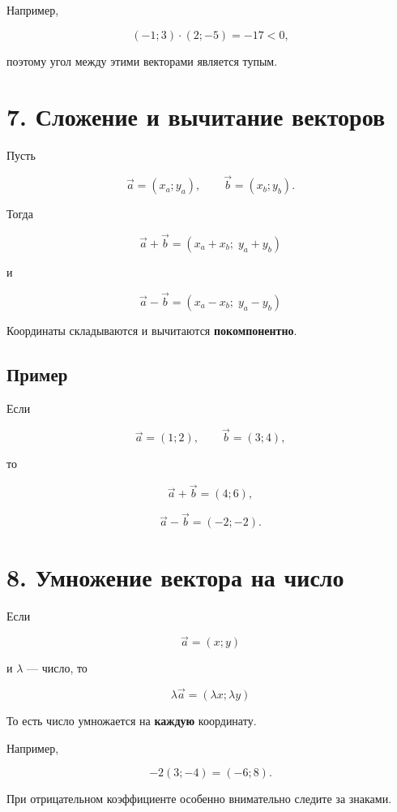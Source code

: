 \documentclass[a4paper,12pt]{article}
\newcommand{\dotprod}{\mathbin{\cdot}}
\begin{document}
Например,

\[
(-1;3)\dotprod(2;-5)=-17<0,
\]

поэтому угол между этими векторами является тупым.


\section*{\color{darkaccent}7. Сложение и вычитание векторов}

Пусть

\[
\vec a=(x_a;y_a),
\qquad
\vec b=(x_b;y_b).
\]

Тогда

\[
\boxed{
\vec a+\vec b
=
(x_a+x_b;\;y_a+y_b)
}
\]

и

\[
\boxed{
\vec a-\vec b
=
(x_a-x_b;\;y_a-y_b)
}
\]

Координаты складываются и вычитаются \textbf{покомпонентно}.

\subsection*{Пример}

Если

\[
\vec a=(1;2),
\qquad
\vec b=(3;4),
\]

то

\[
\vec a+\vec b=(4;6),
\]

\[
\vec a-\vec b=(-2;-2).
\]


\section*{\color{darkaccent}8. Умножение вектора на число}

Если

\[
\vec a=(x;y)
\]

и \(\lambda\) --- число, то

\[
\boxed{
\lambda\vec a=(\lambda x;\lambda y)
}
\]

То есть число умножается на \textbf{каждую} координату.

Например,

\[
-2(3;-4)=(-6;8).
\]

При отрицательном коэффициенте особенно внимательно следите за знаками.

\end{document}
